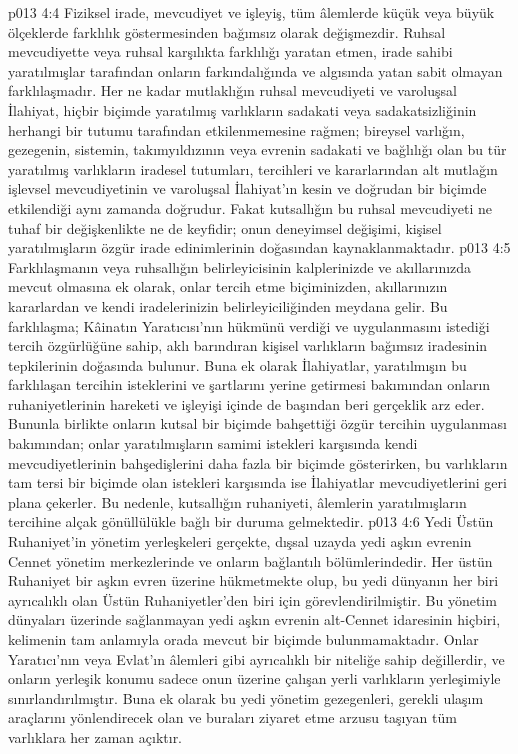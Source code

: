 \vs p013 4:4 Fiziksel irade, mevcudiyet ve işleyiş, tüm âlemlerde küçük veya büyük ölçeklerde farklılık göstermesinden bağımsız olarak değişmezdir. Ruhsal mevcudiyette veya ruhsal karşılıkta farklılığı yaratan etmen, irade sahibi yaratılmışlar tarafından onların farkındalığında ve algısında yatan sabit olmayan farklılaşmadır. Her ne kadar mutlaklığın ruhsal mevcudiyeti ve varoluşsal İlahiyat, hiçbir biçimde yaratılmış varlıkların sadakati veya sadakatsizliğinin herhangi bir tutumu tarafından etkilenmemesine rağmen; bireysel varlığın, gezegenin, sistemin, takımyıldızının veya evrenin sadakati ve bağlılığı olan bu tür yaratılmış varlıkların iradesel tutumları, tercihleri ve kararlarından alt mutlağın işlevsel mevcudiyetinin ve varoluşsal İlahiyat’ın kesin ve doğrudan bir biçimde etkilendiği aynı zamanda doğrudur. Fakat kutsallığın bu ruhsal mevcudiyeti ne tuhaf bir değişkenlikte ne de keyfidir; onun deneyimsel değişimi, kişisel yaratılmışların özgür irade edinimlerinin doğasından kaynaklanmaktadır.
\vs p013 4:5 Farklılaşmanın veya ruhsallığın belirleyicisinin kalplerinizde ve akıllarınızda mevcut olmasına ek olarak, onlar tercih etme biçiminizden, akıllarınızın kararlardan ve kendi iradelerinizin belirleyiciliğinden meydana gelir. Bu farklılaşma; Kâinatın Yaratıcısı’nın hükmünü verdiği ve uygulanmasını istediği tercih özgürlüğüne sahip, aklı barındıran kişisel varlıkların bağımsız iradesinin tepkilerinin doğasında bulunur. Buna ek olarak İlahiyatlar, yaratılmışın bu farklılaşan tercihin isteklerini ve şartlarını yerine getirmesi bakımından onların ruhaniyetlerinin hareketi ve işleyişi içinde de başından beri gerçeklik arz eder. Bununla birlikte onların kutsal bir biçimde bahşettiği özgür tercihin uygulanması bakımından; onlar yaratılmışların samimi istekleri karşısında kendi mevcudiyetlerinin bahşedişlerini daha fazla bir biçimde gösterirken, bu varlıkların tam tersi bir biçimde olan istekleri karşısında ise İlahiyatlar mevcudiyetlerini geri plana çekerler. Bu nedenle, kutsallığın ruhaniyeti, âlemlerin yaratılmışların tercihine alçak gönüllülükle bağlı bir duruma gelmektedir.
\vs p013 4:6 Yedi Üstün Ruhaniyet’in yönetim yerleşkeleri gerçekte, dışsal uzayda yedi aşkın evrenin Cennet yönetim merkezlerinde ve onların bağlantılı bölümlerindedir. Her üstün Ruhaniyet bir aşkın evren üzerine hükmetmekte olup, bu yedi dünyanın her biri ayrıcalıklı olan Üstün Ruhaniyetler’den biri için görevlendirilmiştir. Bu yönetim dünyaları üzerinde sağlanmayan yedi aşkın evrenin alt\hyp{}Cennet idaresinin hiçbiri, kelimenin tam anlamıyla orada mevcut bir biçimde bulunmamaktadır. Onlar Yaratıcı’nın veya Evlat’ın âlemleri gibi ayrıcalıklı bir niteliğe sahip değillerdir, ve onların yerleşik konumu sadece onun üzerine çalışan yerli varlıkların yerleşimiyle sınırlandırılmıştır. Buna ek olarak bu yedi yönetim gezegenleri, gerekli ulaşım araçlarını yönlendirecek olan ve buraları ziyaret etme arzusu taşıyan tüm varlıklara her zaman açıktır.
